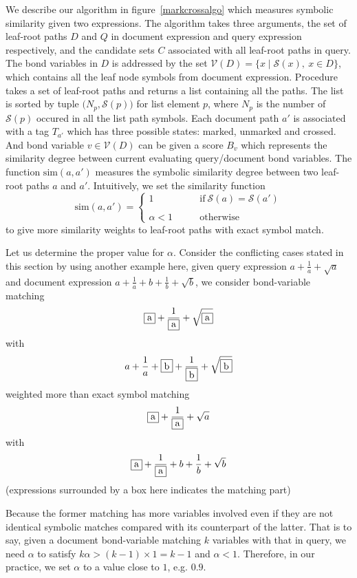 \documentclass{acm_proc_article-sp}
\begin{document}
We describe our algorithm in figure~\ref{markcrossalgo} which measures symbolic similarity given two expressions. 
The  algorithm takes 
three arguments, the set of leaf-root paths $D$ and $Q$ in document expression and query expression respectively, and the candidate sets $C$ associated with all leaf-root paths in query. 
The bond variables in $D$ is addressed by the set $\mathcal{V}(D) = \{x \mid \mathcal{S}(x),\ x \in D\}$, which contains all the leaf node symbols from document expression.
Procedure  takes a set of leaf-root paths and returns a list containing all the paths. 
The list is sorted by tuple $\big(N_p, \mathcal{S}(p)\big)$ for list element $p$, where $N_p$ is the number of $\mathcal{S}(p)$ occured in all the list path symbols. 
Each document path $a'$ is associated with a tag $T_{a'}$ which has three possible states: marked, unmarked and crossed. And bond variable $v \in \mathcal{V}(D)$ can be given a score $B_v$ which represents the similarity degree between current evaluating query/document bond variables. 
The function $\mathrm{sim}(a,a')$ measures the symbolic similarity degree between two leaf-root paths $a$ and $a'$. 
Intuitively, we set the similarity function
$$
\mathrm{sim}(a,a') = 
\left\{
\begin{array}{ll}
1    &\qquad \mathrm{if}\  \mathcal{S}(a) = \mathcal{S}(a')
\\
\\
\alpha < 1  &\qquad \mathrm{otherwise}
\end{array}
\right.
$$
to give more similarity weights to leaf-root paths with exact symbol match.

Let us determine the proper value for $\alpha$. 
Consider the conflicting cases stated in this section by using another example here, 
given query expression $a+\frac 1 a + \sqrt{a}$ and document expression $a+\frac 1 a + b + \frac 1 b + \sqrt{b}$, we consider bond-variable matching 
$$\fbox{a}+\dfrac 1 {\fbox{a}} + \sqrt{\fbox{a}}$$
with 
$$a+\dfrac 1 a + \fbox{b} + \dfrac 1 {\fbox{b}} + \sqrt{\fbox{b}}$$
weighted more than exact symbol matching 
$$\fbox{a}+\dfrac 1 {\fbox{a}} + \sqrt{a}$$ 
with 
$$\fbox{a}+\dfrac 1 {\fbox{a}} + b + \dfrac 1 b + \sqrt{b}$$
(expressions surrounded by a box here indicates the matching part)

Because the former matching has more variables involved even if they are not identical symbolic matches compared with its counterpart of the latter. 
That is to say, given a document bond-variable matching $k$ variables with that in query, we need $\alpha$ to satisfy $ k \alpha > (k-1) \times 1 = k - 1 $
and $\alpha < 1$. 
Therefore, in our practice, we set $\alpha$ to a value close to $1$, e.g. $0.9$.
\end{document}

